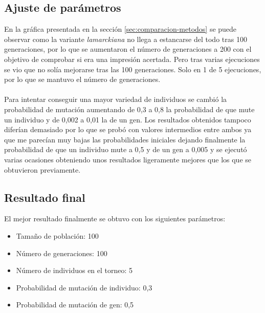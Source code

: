 \subsection{Ajuste de parámetros}

En la gráfica presentada en la sección \ref{sec:comparacion-metodos} se puede observar como la variante \textit{lamarckiana} no llega a estancarse del todo tras 100 generaciones, por lo que se aumentaron el número de generaciones a 200 con el objetivo de comprobar si era una impresión acertada. Pero tras varias ejecuciones se vio que no solía mejorarse tras las 100 generaciones. Solo en 1 de 5 ejecuciones, por lo que se mantuvo el número de generaciones.
\\ \\
Para intentar conseguir una mayor variedad de individuos se cambió la probabilidad de mutación aumentando de 0,3 a 0,8 la probabilidad de que mute un individuo y de 0,002 a 0,01 la de un gen. Los resultados obtenidos tampoco diferían demasiado por lo que se probó con valores intermedios entre ambos ya que me parecían muy bajas las probabilidades iniciales dejando finalmente la probabilidad de que un individuo mute a 0,5 y de un gen a 0,005 y se ejecutó varias ocasiones obteniendo unos resultados ligeramente mejores que los que se obtuvieron previamente.

\subsection{Resultado final}

El mejor resultado finalmente se obtuvo con los siguientes parámetros:

\begin{itemize}
	\item Tamaño de población: 100
	\item Número de generaciones: 100
	\item Número de individuos en el torneo: 5
	\item Probabilidad de mutación de individuo: 0,3
	\item Probabilidad de mutación de gen: 0,5
\end{itemize}

